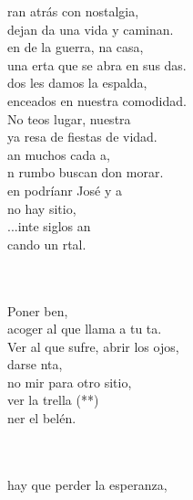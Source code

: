 \documentclass[12pt]{article}
\begin{document}
\begin{multicols*}{2}
\begin{cancion}%
	ran atrás con nostalgia,\\
	dejan da una vida y caminan.\\
	en de la guerra, na casa,\\
	una erta que se abra en sus das.\\
\jump
	dos les damos la espalda,\\
	enceados en nuestra comodidad.\\
	No teos lugar, nuestra \\
	ya resa de fiestas de vidad.\\
\jump
	an muchos cada a, \\
	n rumbo buscan don morar.\\
	en podríanr José y a\\
	no hay sitio,\\
	...inte siglos an\\
	cando un rtal.\\\jump\\
	\begin{chorus}%
	     \\
	Poner ben, \\
	acoger al que llama a tu ta.\\
Ver al que sufre, abrir los ojos,\\
	darse nta,\\
	no mir para otro sitio, \\
	ver la trella (**)\\
	ner el belén. \\
	\end{chorus}%
	\jump\\
	      \\
	 hay que perder la esperanza,\\

\end{cancion}
\end{multicols*}
\end{document}
